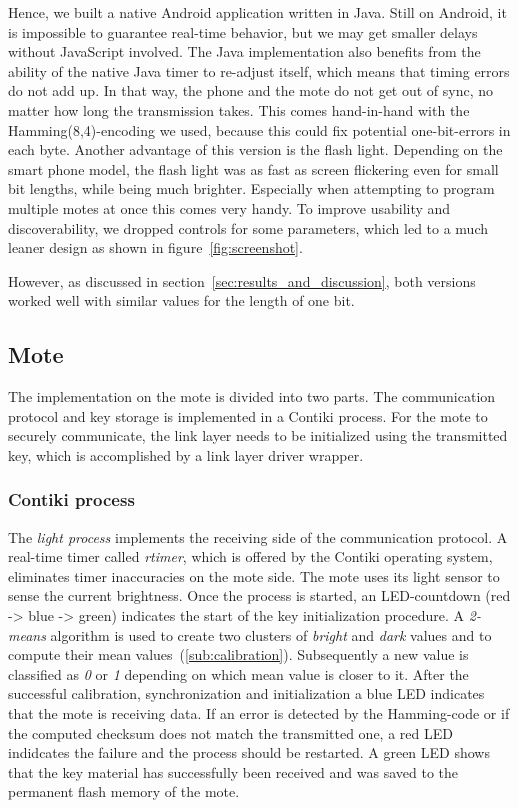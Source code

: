 \documentclass{sig-alternate} %
\begin{document}
Hence, we built a native Android application written in Java.
Still on Android, it is impossible to guarantee real-time behavior, but we may get smaller delays without JavaScript involved.
The Java implementation also benefits from the ability of the native Java timer to re-adjust itself, which means that timing errors do not add up.
In that way, the phone and the mote do not get out of sync, no matter how long the transmission takes.
This comes hand-in-hand with the Hamming(8,4)-encoding we used, because this could fix potential one-bit-errors in each byte.
Another advantage of this version is the flash light.
Depending on the smart phone model, the flash light was as fast as screen flickering even for small bit lengths, while being much brighter.
Especially when attempting to program multiple motes at once this comes very handy.
To improve usability and discoverability, we dropped controls for some parameters, which led to a much leaner design as shown in figure~\ref{fig:screenshot}.

However, as discussed in section~\ref{sec:results_and_discussion}, both versions worked well with similar values for the length of one bit.

\subsection{Mote}
\label{sub:mote}

The implementation on the mote is divided into two parts.
The communication protocol and key storage is implemented in a Contiki process.
For the mote to securely communicate, the link layer needs to be initialized using the transmitted key, which is accomplished by a link layer driver wrapper.

\subsubsection{Contiki process}
\label{ssub:contiki_process}

The \textit{light process} implements the receiving side of the communication protocol.
A real-time timer called \textit{rtimer}, which is offered by the Contiki operating system, eliminates timer inaccuracies on the mote side.
The mote uses its light sensor to sense the current brightness.
Once the process is started, an LED-countdown (red -> blue -> green) indicates the start of the key initialization procedure.
A \mbox{\textit{2-means}} algorithm is used to create two clusters of \textit{bright} and \textit{dark} values and to compute their mean values~(\ref{sub:calibration}).
Subsequently a new value is classified as \textit{0} or \textit{1} depending on which mean value is closer to it.
After the successful calibration, synchronization and initialization a blue LED indicates that the mote is receiving data.
If an error is detected by the Hamming-code or if the computed checksum does not match the transmitted one, a red LED indidcates the failure and the process should be restarted.
A green LED shows that the key material has successfully been received and was saved to the permanent flash memory of the mote.
\end{document}
